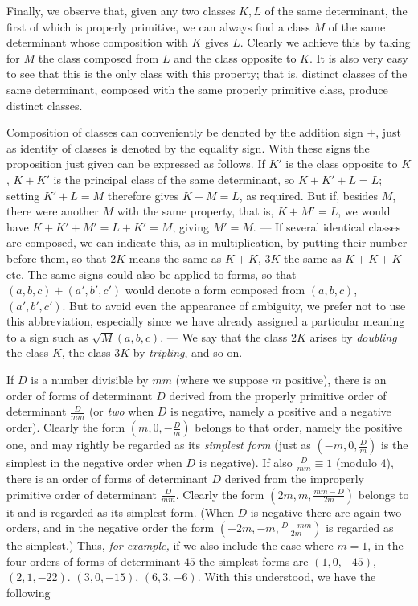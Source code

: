 Finally, we observe that, given any two classes $K,L$ of the same determinant, the first of which is properly primitive, we can always find a class $M$ of the same determinant whose composition with $K$ gives $L$. Clearly we achieve this by taking for $M$ the class composed from $L$ and the class opposite to $K$. It is also very easy to see that this is the only class with this property; that is, distinct classes of the same determinant, composed with the same properly primitive class, produce distinct classes.

Composition of classes can conveniently be denoted by the addition sign $+$, just as identity of classes is denoted by the equality sign. With these signs the proposition just given can be expressed as follows. If $K'$ is the class opposite to $K$, $K+K'$ is the principal class of the same determinant, so $K+K'+L=L$; setting $K'+L=M$ therefore gives $K+M=L$, as required. But if, besides $M$, there were another $M$ with the same property, that is, $K+M'=L$, we would have $K+K'+M'=L+K'=M$, giving $M'=M$. --- If several identical classes are composed, we can indicate this, as in multiplication, by putting their number before them, so that $2K$ means the same as $K+K$, $3K$ the same as $K+K+K$ etc. The same signs could also be applied to forms, so that $(a,b,c)+(a',b',c')$ would denote a form composed from $(a,b,c)$, $(a',b',c')$. But to avoid even the appearance of ambiguity, we prefer not to use this abbreviation, especially since we have already assigned a particular meaning to a sign such as $\surd M(a,b,c)$. --- We say that the class $2K$ arises by \textit{doubling} the class $K$, the class $3K$ by \textit{tripling}, and so on.

If $D$ is a number divisible by $mm$ (where we suppose $m$ positive), there is an order of forms of determinant $D$ derived from the properly primitive order of determinant $\frac{D}{mm}$ (or \textit{two} when $D$ is negative, namely a positive and a negative order). Clearly the form $(m,0,-\frac{D}{m})$ belongs to that order, namely the positive one, and may rightly be regarded as its \textit{simplest form} (just as $(-m,0,\frac{D}{m})$ is the simplest in the negative order when $D$ is negative). If also $\frac{D}{mm}\equiv1$ (modulo $4$), there is an order of forms of determinant $D$ derived from the improperly primitive order of determinant $\frac{D}{mm}$. Clearly the form $(2m,m,\frac{mm-D}{2m})$ belongs to it and is regarded as its simplest form. (When $D$ is negative there are again two orders, and in the negative order the form $(-2m,-m,\frac{D-mm}{2m})$ is regarded as the simplest.) Thus, \textit{for example,} if we also include the case where $m=1$, in the four orders
of forms of determinant $45$ the simplest forms are $(1,0,-45)$, $(2,1,-22)$. $(3,0,-15)$, $(6,3,-6)$. With this understood, we have the following

